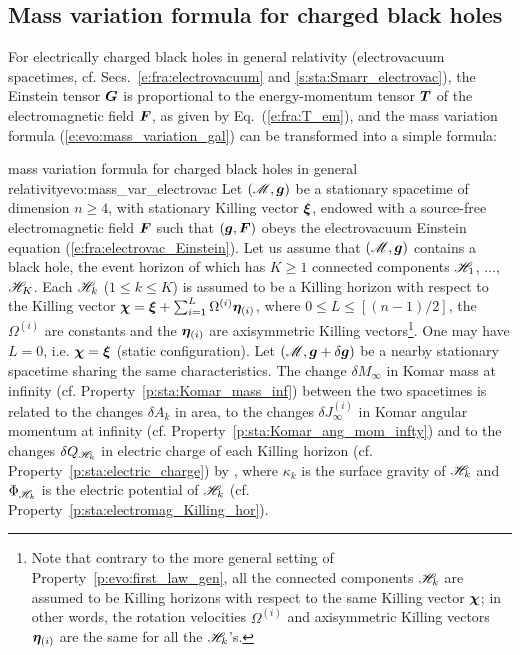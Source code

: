\subsection{Mass variation formula for charged black holes}

For electrically charged black holes in general relativity
(electrovacuum spacetimes, cf. Secs.~\ref{e:fra:electrovacuum} and \ref{s:sta:Smarr_electrovac}),
the Einstein tensor $\bm{G}$ is proportional to the energy-momentum tensor
$\bm{T}$ of the electromagnetic field $\bm{F}$, as given by Eq.~(\ref{e:fra:T_em}),
and the mass variation formula (\ref{e:evo:mass_variation_gal}) can be transformed
into a simple formula:

\begin{tprop}{mass variation formula for charged black holes in general relativity}{evo:mass_var_electrovac}
Let $(\mathscr{M},\bm{g})$ be a stationary spacetime of dimension $n\geq 4$, with stationary
Killing vector $\bm{\xi}$, endowed with a source-free electromagnetic field
$\bm{F}$ such that $(\bm{g},\bm{F})$ obeys the electrovacuum Einstein equation
(\ref{e:fra:electrovac_Einstein}).
Let us assume that $(\mathscr{M},\bm{g})$ contains a black
hole, the event horizon of which has $K \geq 1$ connected components
$\mathscr{H}_{1}$, $\ldots$, $\mathscr{H}_{K}$. Each $\mathscr{H}_{k}$ ($1\leq k \leq K$)
is assumed to be a Killing horizon with respect to the Killing vector
$\bm{\chi} = \bm{\xi} + \sum_{i=1}^{L} \Omega^{(i)} \bm{\eta}_{(i)}$,
where $0\leq L \leq [(n-1)/2]$, the $\Omega^{(i)}$ are constants and
the $\bm{\eta}_{(i)}$ are axisymmetric Killing vectors\footnote{Note that contrary to the more
general setting of Property~\ref{p:evo:first_law_gen},
all the connected components $\mathscr{H}_k$ are assumed to be Killing horizons with
respect to the same Killing vector $\bm{\chi}$; in other words, the
rotation velocities
$\Omega^{(i)}$ and axisymmetric Killing vectors $\bm{\eta}_{(i)}$
are the same for all the $\mathscr{H}_k$'s.}. One may have $L=0$,
i.e. $\bm{\chi} = \bm{\xi}$ (static configuration).
Let $(\mathscr{M},\bm{g}+\delta\bm{g})$ be a nearby stationary spacetime sharing the same characteristics.
The change $\delta M_\infty$ in Komar mass at infinity
(cf. Property~\ref{p:sta:Komar_mass_inf}) between the two spacetimes
is related to the changes $\delta A_k$ in area, to the changes
$\delta J_{\infty}^{(i)}$ in Komar angular momentum at infinity
(cf. Property~\ref{p:sta:Komar_ang_mom_infty})
and to the changes $\delta Q_{\mathscr{H}_k}$ in electric
charge of each Killing horizon (cf. Property~\ref{p:sta:electric_charge})
by
\be \label{e:evo:mass_variation_electovac}
     ,
\ee
where $\kappa_k$ is the surface gravity of $\mathscr{H}_k$ and $\Phi_{\mathscr{H}_k}$
is the electric potential of $\mathscr{H}_k$ (cf. Property~\ref{p:sta:electromag_Killing_hor}).


\end{tprop}

